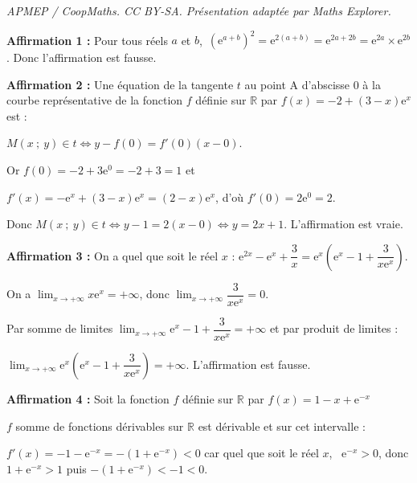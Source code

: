 \documentclass[10pt]{article}
\providecommand{\R}{\mathbb{R}}
\begin{document}
\noindent\textit{APMEP / CoopMaths. CC BY-SA. Présentation adaptée par Maths Explorer.}\par\medskip
\smallskip













\medskip

\textbf{Affirmation 1 :} Pour tous réels $a$ et $b$,\, $\left(\text{e}^{a+b}\right)^2 =
 \text{e}^{2(a + b)} =  \text{e}^{2a + 2b} = \text{e}^{2a} \times \text{e}^{2b}$. Donc l'affirmation est fausse.

\smallskip
\textbf{Affirmation 2 :}  
Une équation de la tangente $t$ au point A d'abscisse 0 à la courbe représentative de la fonction $f$ définie sur $\R$ par $f(x) = - 2 + (3 - x)\text{e}^x$ est :

$M(x~;~y) \in t \iff y - f(0) = f'(0)(x - 0)$.

Or $f(0) = - 2 + 3\text{e}^0 = - 2 + 3 = 1$ et 

$f'(x) = -\text{e}^x + (3 - x)\text{e}^x = (2 - x)\text{e}^x$, d'où $f'(0) = 2\text{e}^0 = 2$.

Donc $M(x~;~y) \in t \iff y - 1 = 2(x - 0) \iff y = 2x + 1$. L'affirmation est vraie.

\smallskip

\textbf{Affirmation 3 :} 
On a quel que soit le réel $x$ : $\text{e}^{2x} - \text{e}^{x} + \dfrac{3}{x}= \text{e}^{x}\left(\text{e}^{x} - 1 + \dfrac{3}{x\text{e}^{x}}\right)$.

On a $\displaystyle\lim_{x \to + \infty} x\text{e}^{x} = + \infty$, donc $\displaystyle\lim_{x \to + \infty} \dfrac{3}{x\text{e}^{x}} = 0$.

Par somme de limites $\displaystyle\lim_{x \to + \infty}\text{e}^{x} - 1 + \dfrac{3}{x\text{e}^{x}} = + \infty$ et par produit de limites :

$\displaystyle\lim_{x \to + \infty}\text{e}^{x}\left(\text{e}^{x} - 1 + \dfrac{3}{x\text{e}^{x}}\right) = + \infty$. L'affirmation est fausse.

\smallskip

\textbf{Affirmation 4 :} 
Soit la fonction $f$ définie sur $\R$ par $f(x) = 1 - x + \text{e}^{-x}$

$f$ somme de fonctions dérivables sur $\R$ est dérivable et sur cet intervalle :

$f'(x) = - 1 - \text{e}^{-x} = - \left(1 + \text{e}^{-x} \right) < 0$ car quel que soit le réel $x$, \, $\text{e}^{-x}  > 0$, donc $1 + \text{e}^{-x} > 1$ puis $- \left(1 + \text{e}^{-x} \right) < - 1 < 0$.
\end{document}
